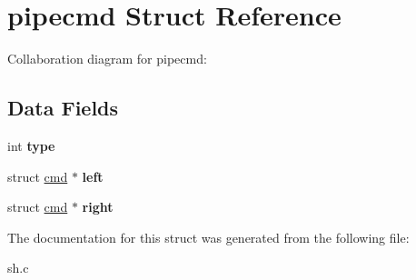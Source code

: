 \hypertarget{structpipecmd}{}\section{pipecmd Struct Reference}
\label{structpipecmd}


Collaboration diagram for pipecmd\+:
\subsection*{Data Fields}
\begin{DoxyCompactItemize}
\item 
\mbox{\label{structpipecmd_a75d1d90b6721ac025c0062ec0947aaea}} 
int {\bfseries type}
\item 
\mbox{\label{structpipecmd_a8922b7eac1f12f729cc7226b8b120f6f}} 
struct \mbox{\hyperlink{structcmd}{cmd}} $\ast$ {\bfseries left}
\item 
\mbox{\label{structpipecmd_a882e2847aa340ae4e201d2e49921b47e}} 
struct \mbox{\hyperlink{structcmd}{cmd}} $\ast$ {\bfseries right}
\end{DoxyCompactItemize}


The documentation for this struct was generated from the following file\+:\begin{DoxyCompactItemize}
\item 
sh.\+c\end{DoxyCompactItemize}
